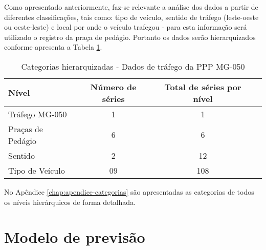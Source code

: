 \documentclass[
	12pt,				%
	openright,			%
	twoside,			%
	a4paper,			%
	english,			%
	french,				%
	spanish,			%
	brazil				%
	]{abntex2}
\begin{document}
Como apresentado anteriormente, faz-se relevante a análise dos dados a partir de diferentes classificações, tais como: tipo de veículo, sentido de tráfego (leste-oeste ou oeste-leste) e local por onde o veículo trafegou - para esta informação será utilizado o registro da praça de pedágio. Portanto os dados serão hierarquizados conforme apresenta a Tabela \ref{tab:hierarquiaMG050}.

\begin{table}[h]
\ABNTEXfontereduzida\caption{Categorias hierarquizadas - Dados de tráfego da PPP MG-050}
\label{tab:hierarquiaMG050}
\centering
\begin{tabular}{l c c c}

\toprule

Nível & Número de séries & Total de séries por nível \\
\midrule
Tráfego MG-050 & 1 & 1\\
Praças de Pedágio & 6 & 6\\
Sentido & 2 & 12\\
Tipo de Veículo & 09 & 108\\

\bottomrule
\end{tabular}
\end{table}

No Apêndice \ref{chap:apendice-categorias} são apresentadas as categorias de todos os níveis hierárquicos de forma detalhada.

\section{Modelo de previsão}



\end{document}
